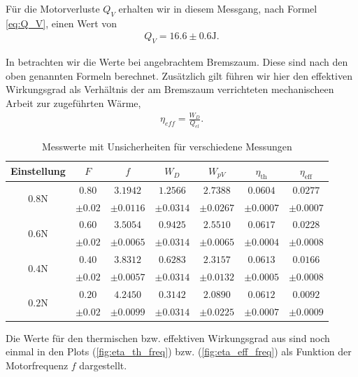Für die Motorverluste $Q_V$ erhalten wir in diesem Messgang, nach Formel \eqref{eq:Q_V}, einen Wert von
\begin{align}
    Q_V = 16.6 ± 0.6 \si{\joule}.
\end{align}

In  betrachten wir die Werte bei angebrachtem Bremszaum. Diese sind nach den oben genannten Formeln berechnet. Zusätzlich gilt führen wir hier den effektiven Wirkungsgrad als Verhältnis der am Bremszaum verrichteten mechanischeen Arbeit zur zugeführten Wärme,
\begin{align}
    \eta_{eff} = \frac{W_D}{Q_{el}}.
\end{align}

\begin{table}[H]
    \centering
    \begin{tabular}{c c c c c c c}
    \toprule
    \textbf{Einstellung} & \boldmath$F$ & \boldmath$f$ & \boldmath$W_D$ & \boldmath$W_{pV}$ & \boldmath$\eta_{\text{th}}$ & \boldmath$\eta_{\text{eff}}$ \\
    \midrule
    \multirow{2}{*}{\boldmath$0.8\si{\newton}$} & $0.80$ & $3.1942$ & $1.2566$ & $2.7388$ & $0.0604$ & $0.0277$ \\
     & $\pm 0.02$ & $\pm 0.0116$ & $\pm 0.0314$ & $\pm 0.0267$ & $\pm 0.0007$ & $\pm 0.0007$ \\
    \midrule
    \multirow{2}{*}{\boldmath$0.6\si{\newton}$} & $0.60$ & $3.5054$ & $0.9425$ & $2.5510$ & $0.0617$ & $0.0228$ \\
     & $\pm 0.02$ & $\pm 0.0065$ & $\pm 0.0314$ & $\pm 0.0065$ & $\pm 0.0004$ & $\pm 0.0008$ \\
    \midrule
    \multirow{2}{*}{\boldmath$0.4\si{\newton}$} & $0.40$ & $3.8312$ & $0.6283$ & $2.3157$ & $0.0613$ & $0.0166$ \\
     & $\pm 0.02$ & $\pm 0.0057$ & $\pm 0.0314$ & $\pm 0.0132$ & $\pm 0.0005$ & $\pm 0.0008$ \\
    \midrule
    \multirow{2}{*}{\boldmath$0.2\si{\newton}$} & $0.20$ & $4.2450$ & $0.3142$ & $2.0890$ & $0.0612$ & $0.0092$ \\
     & $\pm 0.02$ & $\pm 0.0099$ & $\pm 0.0314$ & $\pm 0.0225$ & $\pm 0.0007$ & $\pm 0.0009$ \\
    \bottomrule
    \end{tabular}
    \label{tab:werte_gebremst}
    \caption{Messwerte mit Unsicherheiten für verschiedene Messungen}
\end{table}

Die Werte für den thermischen bzw. effektiven Wirkungsgrad aus  sind noch einmal in den Plots (\ref{fig:eta_th_freq}) bzw. (\ref{fig:eta_eff_freq}) als Funktion der Motorfrequenz $f$ dargestellt.

